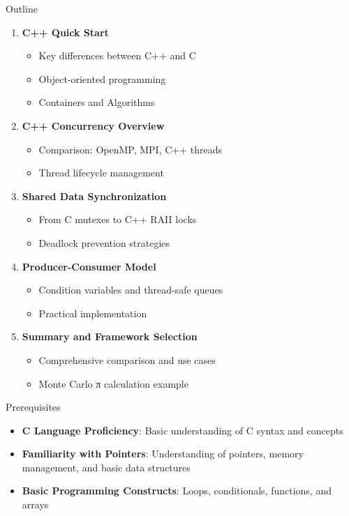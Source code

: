 \begin{frame}[fragile]{ Outline}
	\begin{enumerate}
		\item \textbf{C++ Quick Start}
		      \begin{itemize}
			      \item Key differences between C++ and C
			      \item Object-oriented programming
			      \item Containers and Algorithms
		      \end{itemize}
		\item \textbf{C++ Concurrency Overview}
		      \begin{itemize}
			      \item Comparison: OpenMP, MPI, C++ threads
			      \item Thread lifecycle management
		      \end{itemize}
		\item \textbf{Shared Data Synchronization}
		      \begin{itemize}
			      \item From C mutexes to C++ RAII locks
			      \item Deadlock prevention strategies
		      \end{itemize}
		\item \textbf{Producer-Consumer Model}
		      \begin{itemize}
			      \item Condition variables and thread-safe queues
			      \item Practical implementation
		      \end{itemize}
		\item \textbf{Summary and Framework Selection}
		      \begin{itemize}
			      \item Comprehensive comparison and use cases
			      \item Monte Carlo π calculation example
		      \end{itemize}
	\end{enumerate}
\end{frame}

\begin{frame}[fragile]{ Prerequisites}
	\begin{itemize}
		\item \textbf{C Language Proficiency}: Basic understanding of C syntax and concepts
		\item \textbf{Familiarity with Pointers}: Understanding of pointers, memory management, and basic data structures
		\item \textbf{Basic Programming Constructs}: Loops, conditionals, functions, and arrays
	\end{itemize}
\end{frame}
